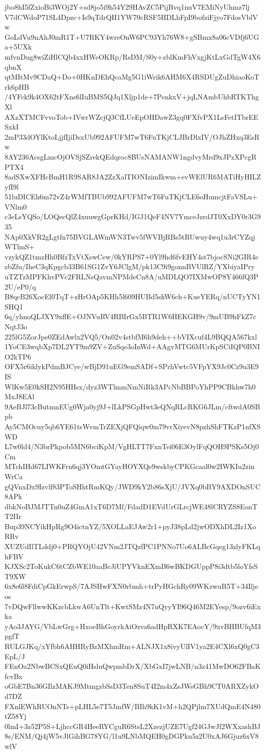 jbo8hI5fZxioBi3WOj2Y+sd8jo5i9h54Y29HAvZC5PijBvq1nuV7EMiNyUhmz7lj
V7dCWdoP71SL4Dpzc+Is9qTdrQH1YW70cRSF5HDLhFpI9bofziFjyo7FdosVblVw
GoLdVu9nAhJ0mR1T+U7RKY4wreOnW6PC93Yh76W8+gSBmx8a06cVDfj6UGa+5UXk
mfvnDug8wiZiHlCQb4xxHWeOKRp/RsDM/S0y+zblKmFhVxgjKtLxGdTgW4X6qbnX
qtMItMv9CDaQ+Do+0HKnDEhQcaMg5G1iWrik6AHM6X4RSDUgZuDhiaoKoTrk6pHB
/4YFck9k4OX62tFXns6lIuBMS5QJq1Xljp1de+7PenkxV+jqLNAmbUhbRTKThgXl
AXzXTMCFvvoTob+IVwrWZcjQ3CfLUeEpOHDawZ3gq0FXfvPX1LsFetITbrEESxkI
2mP33dOYlKtoLjjfIjiDsxUb992AFUFM7wT6FuTKjCLJBrDlxIV/OJhZHxq3EsRw
8AY236AcsgLmcOjOVSjSZrekQEdqroc8BUsNAMANW1ngdvyMrd9xJPzXPcgRPTX4
8adSXwXFHcBmH1R9SAR8JA2ZzXalTIONIzimIkwm+evWElUR6MATiHyHILZyfI9l
51luDICEh6m72vZ4rWMfTBUb992AFUFM7wT6FuTKjCLE6oHumcjtFaVSLu+VNlm0
c3eLsYQSo/LOQecQlZ4xuuwgGprKHd/IGJ1QeF4NV7YmceJzrdJT0XxDY0r3G935
NAp0XkVR2gLgtfn75BVGLAWmWN3Twv5fWVBjRBs5tRUwuy4wq1u3rCYZqjWTlmS+
vzykQZ1tmzHh0BfzTxVtXswCew/0kYRPS7+0Yl9hd6fvEHY4st7bjocSNi2GIR4e
zbZfu/IheC3qKpgcb33B61SG1ZvY6JClgM/pk13C9i9gonnBVUlRZ/YXbiyaIPry
uTZTzMPFKhvPVc2FRLNsQavmNPMdeCn8A/uMDLQO7IXMwOP8Y466fQ3P2U/eP0/q
B8qcB26XocEl0TqT+zHrOAp5KHh5l609HUBd5skW6ch+KueYERq/nUCTyYN1SHQ1
6q/yhnoQLJXY9xffE+OJNVuRV4RBIrGx5BTR1W6HEKGH9v/9mUB9hFkZ7cNqtJ3o
225lG5ZorJpe0ZEdAwlx2VQ5/On02v4stbfM6h9deh++bVIXcuf4L9BQQA567kxl
1YoCE3wqbXp7DL2YT9m9ZV+ZuSqe3oInWd+AAgvMTG6MUrKpSCiIQP0BNIO2kTP6
OFX5r6iklykPdmBJCye/wBjD91uEG9emSADf+SPrhVwtc5VFpYX9Jc0Cz9u3E9IS
WlKw5E0kSH2N95HHsx/dyz3WTlmmNmNiRk3APcNbBBPoYhPP9CBkhw7h0MxJ8EAl
9AeBJl73cButmnEUg0Wja0yj9J+lLkPSGpHwt3eQNqRLcRKG6JLm/cftwdA0SBpb
Ay5CMOcuy5qb6YE61tsWvmTrZEXjQFQiqw0m79vrXiyevN8pzhShFTKzP1nfXSWD
L7w0ld4/N3brPkpob5MN6bciKpM/VgHLTT7FxnTei06E3OylFqQOH9PSKs5Oj0Cm
MTchIHd67LIWKFrn6qj3YOmtGYayHOYXQs9wskbyCPKGcaal0w2IWKIu2zinWrCa
gQVnxDx9Izvlf83PToSHhtRmKQy/JWD9kY2b86sXjU/JVXq0bBY9AXDOnSUC8APk
dbkNoBJMJTTn0uZ4GmA1xT6D7Mf/FdadD1EVdUrGLrcjWE48lCRYZS8EonTT2IIr
Bup39NCYikHpRg9O4ictnYZ/5XOLLaEJAw2r1+pyJ38pLd2jwODXhDL2Iz1XoRRv
XUZUdIlTLddj0+PRQYOjU42VNm2JTQzfPC1PNNo7Uo6ALBcGqeg13zlyFKLqhFBV
KJXSc2ToKukC6tCZbWE10aaBcJiUPYVknEXmB6wBKDGUppP8i3dtb5loYfsST9XW
6x8e6l8FdiCpGkErwpS/7AJSHwFXN0rbmh+trPyHGchRy09WKzwuR5T+34Iljeos
7vDQwFllwwKKzcbLkwA6UnTlt+KwtSMz4N7uQyyYI96Q46M2EYesp/9ozv6iExka
yAo3JAYG/VbLwGrg+HxoeBhGoyrkAiOzva6adHpRXK7EAocY/9xvBHBUfqM3pgfT
RULGJKq/xYfbh6AHHRyBzMXhmRm+ALNJX1x8ivyUlIV1ya2E4CXl6xQ0gC3EpL/J
FEnOa2NbwBCSxQEuQ0iHsluQwpmbDrX/XbGxI7jwLNB/n3z41MwDO62FBaKfcvBx
oGbE7Bn36GIlzMAKJ9MtmgzbSsD3Ten8SuT4I2m4xZsJWsGBh9CT0ARXZykOd7DZ
FXnlEWhRUOnNTs+pLHL5e7T5JmfW/BIh9kK1vM+h2QPjlm7XUdQmE4N480tZ58Yj
0lmI+3z52P5S+LjhccGR4HeeRYCguR6StsL2XzezjUZE7Ugf24GJwJf2WXxashBJ
8s/ENM/Qj4jW5vJlGihBG78YG/l1u9LNbMQEH0gDGPku5z2U0xAJ6Gjuz6xV8wlV
